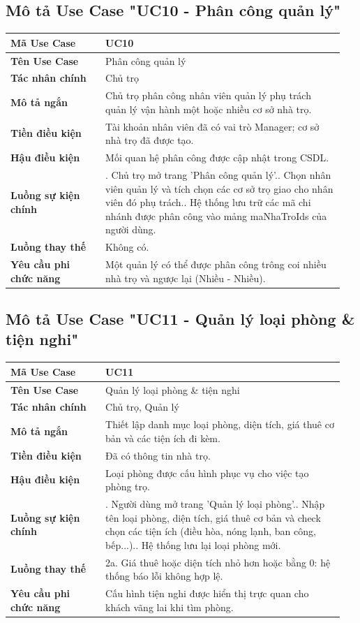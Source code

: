 \documentclass[a4paper,oneside]{report}
\begin{document}
\subsection{Mô tả Use Case "UC10 - Phân công quản lý"}

\begin{longtable}[]{@{}>{\RaggedRight\arraybackslash}p{0.27\linewidth}>{\RaggedRight\arraybackslash}p{0.68\linewidth}@{}}
\toprule
\textbf{Mã Use Case} & UC10\tabularnewline
\midrule
\endhead
\textbf{Tên Use Case} & Phân công quản lý\tabularnewline
\textbf{Tác nhân chính} & Chủ trọ\tabularnewline
\textbf{Mô tả ngắn} & Chủ trọ phân công nhân viên quản lý phụ trách quản
lý vận hành một hoặc nhiều cơ sở nhà trọ.\tabularnewline
\textbf{Tiền điều kiện} & Tài khoản nhân viên đã có vai trò Manager; cơ
sở nhà trọ đã được tạo.\tabularnewline
\textbf{Hậu điều kiện} & Mối quan hệ phân công được cập nhật trong
CSDL.\tabularnewline
\textbf{Luồng sự kiện chính} & 1. Chủ trọ mở trang
'Phân công quản lý'.\newline 2. Chọn nhân viên quản lý và tích chọn
các cơ sở trọ giao cho nhân viên đó phụ trách.\newline 3. Hệ thống
lưu trữ các mã chi nhánh được phân công vào mảng maNhaTroIds của người
dùng.\tabularnewline
\textbf{Luồng thay thế} & Không có.\tabularnewline
\textbf{Yêu cầu phi chức năng} & Một quản lý có thể được phân công trông
coi nhiều nhà trọ và ngược lại (Nhiều - Nhiều).\tabularnewline
\bottomrule
\end{longtable}

\subsection{Mô tả Use Case "UC11 - Quản lý loại phòng \& tiện nghi"}

\begin{longtable}[]{@{}>{\RaggedRight\arraybackslash}p{0.27\linewidth}>{\RaggedRight\arraybackslash}p{0.68\linewidth}@{}}
\toprule
\textbf{Mã Use Case} & UC11\tabularnewline
\midrule
\endhead
\textbf{Tên Use Case} & Quản lý loại phòng \& tiện nghi\tabularnewline
\textbf{Tác nhân chính} & Chủ trọ, Quản lý\tabularnewline
\textbf{Mô tả ngắn} & Thiết lập danh mục loại phòng, diện tích, giá thuê
cơ bản và các tiện ích đi kèm.\tabularnewline
\textbf{Tiền điều kiện} & Đã có thông tin nhà trọ.\tabularnewline
\textbf{Hậu điều kiện} & Loại phòng được cấu hình phục vụ cho việc tạo
phòng trọ.\tabularnewline
\textbf{Luồng sự kiện chính} & 1. Người dùng mở trang
'Quản lý loại phòng'.\newline 2. Nhập tên loại phòng, diện tích,
giá thuê cơ bản và check chọn các tiện ích (điều hòa, nóng lạnh, ban
công, bếp...).\newline 3. Hệ thống lưu lại loại phòng
mới.\tabularnewline
\textbf{Luồng thay thế} & 2a. Giá thuê hoặc diện tích nhỏ hơn hoặc bằng
0: hệ thống báo lỗi không hợp lệ.\tabularnewline
\textbf{Yêu cầu phi chức năng} & Cấu hình tiện nghi được hiển thị trực
quan cho khách vãng lai khi tìm phòng.\tabularnewline
\bottomrule
\end{longtable}
\end{document}
